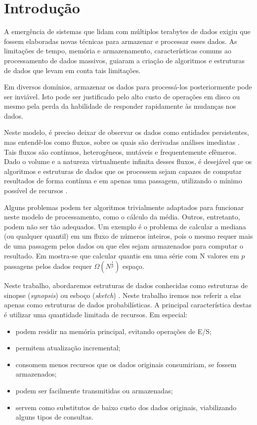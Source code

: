 \section{Introdução}

A emergência de sistemas que lidam com múltiplos terabytes de dados exigiu que fossem elaboradas novas técnicas para armazenar e processar esses dados. As limitações de tempo, memória e armazenamento, características comuns ao processamento de dados massivos, guiaram a criação de algoritmos e estruturas de dados que levam em conta tais limitações.

Em diversos domínios, armazenar os dados para processá-los posteriormente pode ser inviável. Isto pode ser justificado pelo alto custo de operações em disco ou mesmo pela perda da habilidade de responder rapidamente às mudanças nos dados.

Neste modelo, é preciso deixar de observar os dados como entidades persistentes, mas entendê-los como fluxos, sobre os quais são derivadas análises imediatas \cite{babcock2002models}. Tais fluxos são contínuos, heterogêneos, mutáveis e frequentemente efêmeros. Dado o volume e a natureza virtualmente infinita desses fluxos, é desejável que os algoritmos e estruturas de dados que os processem sejam capazes de computar resultados de forma contínua e em apenas uma passagem, utilizando o mínimo possível de recursos \cite{alon1996space}.

Alguns problemas podem ter algoritmos trivialmente adaptados para funcionar neste modelo de processamento, como o cálculo da média. Outros, entretanto, podem não ser tão adequados. Um exemplo é o problema de calcular a mediana (ou qualquer quantil) em um fluxo de números inteiros, pois o mesmo requer mais de uma passagem pelos dados ou que eles sejam armazenados para computar o resultado. Em \cite{munro1980selection} mostra-se que calcular quantis em uma série com N valores em $p$ passagens pelos dados requer $\Omega(N^{\frac{1}{p}})$ espaço.

Neste trabalho, abordaremos estruturas de dados conhecidas como estruturas de sinopse (\emph{synopsis}) ou esboço (\emph{sketch}) \cite{gibbons1999synopsis}. Neste trabalho iremos nos referir a elas apenas como estruturas de dados probabilísticas. A principal característica destas é utilizar uma quantidade limitada de recursos. Em especial:

\begin{itemize}
  \item podem residir na memória principal, evitando operações de E/S;
  \item permitem atualização incremental;
  \item consomem menos recursos que os dados originais consumiriam, se fossem armazenados;
  \item podem ser facilmente transmitidas ou armazenadas;
  \item servem como substitutos de baixo custo dos dados originais, viabilizando alguns tipos de consultas.
\end{itemize}

